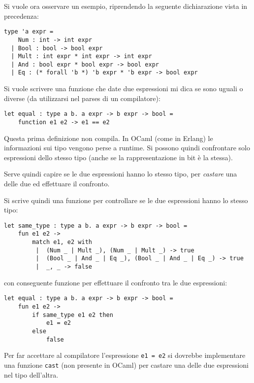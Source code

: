 \documentclass{article}
\begin{document}
Si vuole ora osservare un esempio, riprendendo la seguente dichiarazione vista in precedenza:
\begin{tcolorbox}
\begin{verbatim}
type 'a expr =
    Num : int -> int expr
  | Bool : bool -> bool expr
  | Mult : int expr * int expr -> int expr
  | And : bool expr * bool expr -> bool expr
  | Eq : (* forall 'b *) 'b expr * 'b expr -> bool expr
\end{verbatim}
\end{tcolorbox}
Si vuole scrivere una funzione che date due espressioni mi dica se sono uguali o diverse (da utilizzarsi nel parses di un compilatore):
\begin{tcolorbox}
\begin{verbatim}
let equal : type a b. a expr -> b expr -> bool = 
    function e1 e2 -> e1 == e2
\end{verbatim}
\end{tcolorbox}
Questa prima definizione non compila. In OCaml (come in Erlang) le informazioni sui tipo vengono perse a runtime. Si possono quindi confrontare solo espressioni dello stesso tipo (anche se la rappresentazione in bit è la stessa).

Serve quindi capire se le due espressioni hanno lo stesso tipo, per \textit{castare} una delle due ed effettuare il confronto.

Si scrive quindi una funzione per controllare se le due espressioni hanno lo stesso tipo:
\begin{tcolorbox}
\begin{verbatim}
let same_type : type a b. a expr -> b expr -> bool = 
    fun e1 e2 ->
        match e1, e2 with
         |  (Num _ | Mult _), (Num _ | Mult _) -> true
         |  (Bool _ | And _ | Eq _), (Bool _ | And _ | Eq _) -> true
         |  _, _ -> false
\end{verbatim}
\end{tcolorbox}
con conseguente funzione per effettuare il confronto tra le due espressioni:
\begin{tcolorbox}
\begin{verbatim}
let equal : type a b. a expr -> b expr -> bool = 
    fun e1 e2 ->
        if same_type e1 e2 then
            e1 = e2
        else
            false
\end{verbatim}
\end{tcolorbox}
Per far accettare al compilatore l'espressione \texttt{e1 = e2} si dovrebbe implementare una funzione \texttt{cast} (non presente in OCaml) per castare una delle due espressioni nel tipo dell'altra.
\end{document}
